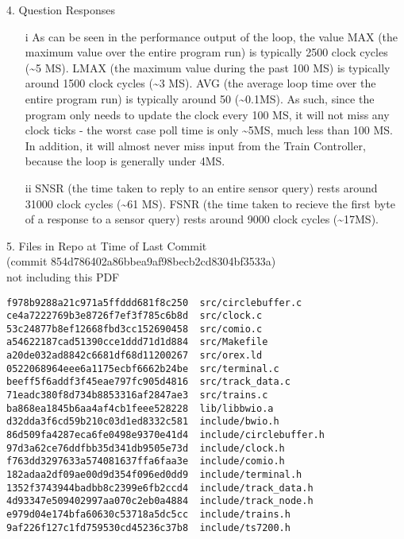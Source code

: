 \documentclass{article}
\begin{document}
{\large 4. Question Responses}
\begin{enumerate}
\item[i]
    As can be seen in the performance output of the loop, the value MAX (the maximum value over the entire program run) is typically 2500 clock cycles (\textasciitilde5 MS). LMAX (the maximum value during the past 100 MS) is typically around 1500 clock cycles (\textasciitilde3 MS). AVG (the average loop time over the entire program run) is typically around 50 (\textasciitilde0.1MS). As such, since the program only needs to update the clock every 100 MS, it will not miss any clock ticks - the worst case poll time is only \textasciitilde5MS, much less than 100 MS. In addition, it will almost never miss input from the Train Controller, because the loop is generally under 4MS.
\item[ii]
    SNSR (the time taken to reply to an entire sensor query) rests around 31000 clock cycles (\textasciitilde61 MS). FSNR (the time taken to recieve the first byte of a response to a sensor query) rests around 9000 clock cycles (\textasciitilde17MS).

\end{enumerate}

{\large 5. Files in Repo at Time of Last Commit \\(commit 854d786402a86bbea9af98becb2cd8304bf3533a) \\ not including this PDF}
\begin{verbatim}
f978b9288a21c971a5ffddd681f8c250  src/circlebuffer.c
ce4a7222769b3e8726f7ef3f785c6b8d  src/clock.c
53c24877b8ef12668fbd3cc152690458  src/comio.c
a54622187cad51390cce1ddd71d1d884  src/Makefile
a20de032ad8842c6681df68d11200267  src/orex.ld
0522068964eee6a1175ecbf6662b24be  src/terminal.c
beeff5f6addf3f45eae797fc905d4816  src/track_data.c
71eadc380f8d734b8853316af2847ae3  src/trains.c
ba868ea1845b6aa4af4cb1feee528228  lib/libbwio.a
d32dda3f6cd59b210c03d1ed8332c581  include/bwio.h
86d509fa4287eca6fe0498e9370e41d4  include/circlebuffer.h
97d3a62ce76ddfbb35d341db9505e73d  include/clock.h
f763dd3297633a574081637ffa6faa3e  include/comio.h
182adaa2df09ae00d9d354f096ed0dd9  include/terminal.h
1352f3743944badbb8c2399e6fb2ccd4  include/track_data.h
4d93347e509402997aa070c2eb0a4884  include/track_node.h
e979d04e174bfa60630c53718a5dc5cc  include/trains.h
9af226f127c1fd759530cd45236c37b8  include/ts7200.h
\end{verbatim}
\end{document}
